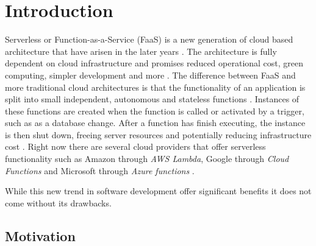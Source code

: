 \newcommand{\mic}{microservice }
\newcommand{\arc}{architecture }



\chapter{Introduction}
\label{cha:introduction}
Serverless or Function-as-a-Service (FaaS) is a new generation of cloud based architecture that have arisen in the later years \cite{serverless_impact, serverless_computing_current_trends}. The architecture is fully dependent on cloud infrastructure and promises reduced operational cost, green computing, simpler development and more \cite{martin_fowler_serverless}. The difference between FaaS and more traditional cloud architectures is that the functionality of an application is split into small independent, autonomous and stateless functions \cite{serverless_computing_current_trends}. Instances of these functions are created when the function is called or activated by a trigger, such as as a database change. After a function has finish executing, the instance is then shut down, freeing server resources and potentially reducing infrastructure cost \cite{cost_comparison_of_running_monolithic_microservice_AWS_lambda}. Right now there are several cloud providers that offer serverless functionality such as Amazon through \textit{AWS Lambda}, Google through \textit{Cloud Functions} and Microsoft through \textit{Azure functions} \cite{serverless_impact}. 

While this new trend in software development offer significant benefits it does not come without its drawbacks. 

\section{Motivation}
\label{sec:motivation}



